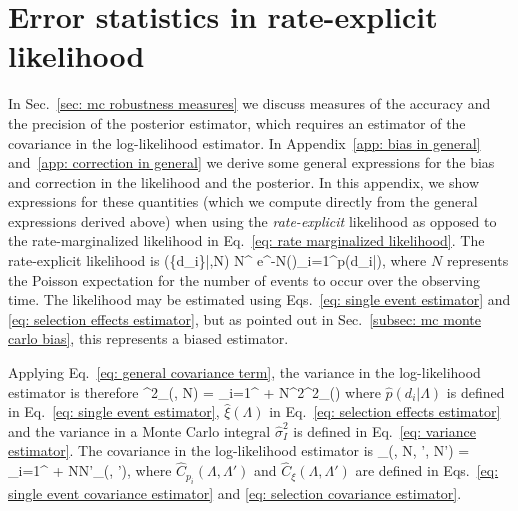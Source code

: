\section{Error statistics in rate-explicit likelihood}
\label{app: rate-explicit equations}
In Sec.~\ref{sec: mc robustness measures} we discuss measures of the accuracy and the precision of the posterior estimator, which requires an estimator of the covariance in the log-likelihood estimator. In Appendix~\ref{app: bias in general} and~\ref{app: correction in general} we derive some general expressions for the bias and correction in the likelihood and the posterior. In this appendix, we show expressions for these quantities (which we compute directly from the general expressions derived above) when using the \textit{rate-explicit} likelihood as opposed to the rate-marginalized likelihood in Eq.~\ref{eq: rate marginalized likelihood}. The rate-explicit likelihood is
\beq
{}(\{d_i\}|\Lambda,N) \propto N^{\Nobs} e^{-N\xi(\Lambda)}\prod_{i=1}^{\Nobs}p(d_i|\Lambda),
\label{eq: rate explicit likelihood}
\eeq
where $N$ represents the Poisson expectation for the number of events to occur over the observing time. 
The likelihood may be estimated using Eqs.~\ref{eq: single event estimator} and \ref{eq: selection effects estimator}, but as pointed out in Sec.~\ref{subsec: mc monte carlo bias}, this represents a biased estimator. 

Applying Eq.~\ref{eq: general covariance term}, the variance in the log-likelihood estimator is therefore
\beq
\hat{\sigma}^2_{\ln{}}(\Lambda, N) = \sum_{i=1}^{\Nobs}
+ N^2\hat{\sigma}^2_{\xi}(\Lambda)
\eeq
where $\hat{p}(d_i|\Lambda)$ is defined in Eq.~\ref{eq: single event estimator}, $\hat{\xi}(\Lambda)$ in Eq.~\ref{eq: selection effects estimator} and the variance in a Monte Carlo integral $\hat{\sigma}^2_I$ is defined in Eq.~\ref{eq: variance estimator}. The covariance in the log-likelihood estimator is
\beq
{}_{\ln{}}(\Lambda, N, \Lambda', N') = \sum_{i=1}^{\Nobs}
+ NN'_{\xi}(\Lambda, \Lambda'),
\eeq
where $\hat{C}_{p_i}(\Lambda, \Lambda')$ and $\hat{C}_{\xi}(\Lambda, \Lambda')$ are defined in Eqs.~\ref{eq: single event covariance estimator} and \ref{eq: selection covariance estimator}.

